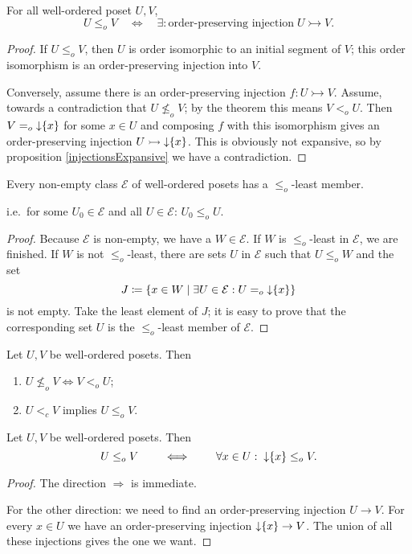\begin{corollary}
For all well-ordered poset $U,V$,
\[ U \leq_o V \quad \iff \quad \exists: \text{order-preserving injection} \;U\rightarrowtail V. \]
\end{corollary}
\begin{proof}
If $U \leq_o V$, then $U$ is order isomorphic to an initial segment of $V$; this order isomorphism is an order-preserving injection into $V$.

Conversely, assume there is an order-preserving injection $f:U\rightarrowtail V$. Assume, towards a contradiction that $U \nleq_o V$; by the theorem this means $V <_o U$. Then $V=_o \operatorname{\downarrow}\{x\}$ for some $x\in U$ and composing $f$ with this isomorphism gives an order-preserving injection $U\rightarrowtail \operatorname{\downarrow}\{x\}$. This is obviously not expansive, so by proposition \ref{injectionsExpansive} we have a contradiction.
\end{proof}
\begin{corollary}\label{wellfoundednessOfWosetComparison}
Every non-empty class $\mathcal{E}$ of well-ordered posets has a $\leq_o$-least member.
\end{corollary}
i.e.\ for some $U_0\in \mathcal{E}$ and all $U\in \mathcal{E}$: $U_0\leq_o U$.
\begin{proof}
Because $\mathcal{E}$ is non-empty, we have a $W\in\mathcal{E}$. If $W$ is $\leq_o$-least in $\mathcal{E}$, we are finished. If $W$ is not $\leq_o$-least, there are sets $U$ in $\mathcal{E}$ such that $U\leq_o W$ and the set
\[ J \coloneqq \{x\in W\;|\;\exists U\in\mathcal{E}: U =_o \operatorname{\downarrow}\{x\}\} \]
is not empty. Take the least element of $J$; it is easy to prove that the corresponding set $U$ is the $\leq_o$-least member of $\mathcal{E}$.
\end{proof}
\begin{corollary} \label{ordinalInequalitiesLemma}
Let $U,V$ be well-ordered posets. Then
\begin{enumerate}
\item $U\nleq_o V \iff V <_o U$;
\item $U <_c V$ implies $U \leq_o V$.
\end{enumerate}
\end{corollary}

\begin{proposition} \label{ordinalInequalityFromInitialSegments}
Let $U,V$ be well-ordered posets. Then
\[ U \leq_o V \qquad\iff\qquad \forall x\in U:\; \operatorname{\downarrow}\{x\} \leq_o V.   \]
\end{proposition}
\begin{proof}
The direction $\Rightarrow$ is immediate.

For the other direction: we need to find an order-preserving injection $U\to V$. For every $x\in U$ we have an order-preserving injection $\operatorname{\downarrow}\{x\} \to V$. The union of all these injections gives the one we want.
\end{proof}

